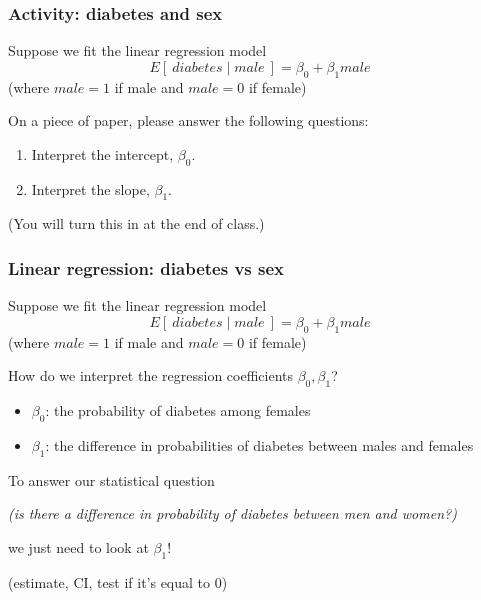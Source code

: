 \documentclass[12pt, 
hyperref={colorlinks=true, linkcolor=blue, urlcolor=cyan}]{beamer}
\begin{document}
\begin{frame}
\frametitle{Activity: diabetes and sex}

Suppose we fit the linear regression model $$E[\ diabetes \mid male\ ] = \beta_0 + \beta_1 male$$ (where $male = 1$ if male and $male = 0$ if female)

On a piece of paper, please answer the following questions:

\begin{enumerate}
\item Interpret the intercept, $\beta_0$.
\item Interpret the slope, $\beta_1$.
\end{enumerate}

(You will turn this in at the end of class.)
\end{frame}

\begin{frame}
\frametitle{Linear regression: diabetes vs sex}

Suppose we fit the linear regression model $$E[\ diabetes \mid male\ ] = \beta_0 + \beta_1 male$$ (where $male = 1$ if male and $male = 0$ if female)

How do we interpret the regression coefficients $\beta_0, \beta_1$? \vspace{-0.3cm}

\begin{itemize}
\item \color{blue} $\beta_0$: \pause the probability of diabetes among females \pause
\item $\beta_1$: \pause the difference in probabilities of diabetes between males and females \pause \color{black}
\end{itemize}

To answer our statistical question \begin{small}\textit{(is there a difference in probability of diabetes between men and women?)}\end{small} we just need to look at $\beta_1$! \begin{small} (estimate, CI, test if it's equal to 0) \end{small}
\end{frame}
\end{document}
